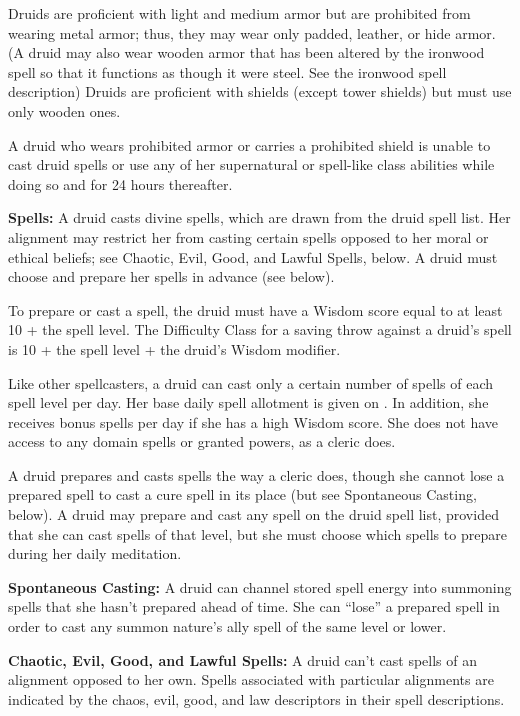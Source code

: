 Druids are proficient with light and medium armor but are prohibited from wearing metal armor; thus, they may wear only padded, leather, or hide armor. (A druid may also wear wooden armor that has been altered by the ironwood spell so that it functions as though it were steel. See the ironwood spell description) Druids are proficient with shields (except tower shields) but must use only wooden ones.

A druid who wears prohibited armor or carries a prohibited shield is unable to cast druid spells or use any of her supernatural or spell-like class abilities while doing so and for 24 hours thereafter.

\textbf{Spells:} A druid casts divine spells, which are drawn from the druid spell list. Her alignment may restrict her from casting certain spells opposed to her moral or ethical beliefs; see Chaotic, Evil, Good, and Lawful Spells, below. A druid must choose and prepare her spells in advance (see below).

To prepare or cast a spell, the druid must have a Wisdom score equal to at least 10 + the spell level. The Difficulty Class for a saving throw against a druid's spell is 10 + the spell level + the druid's Wisdom modifier.

Like other spellcasters, a druid can cast only a certain number of spells of each spell level per day. Her base daily spell allotment is given on . In addition, she receives bonus spells per day if she has a high Wisdom score. She does not have access to any domain spells or granted powers, as a cleric does.

A druid prepares and casts spells the way a cleric does, though she cannot lose a prepared spell to cast a cure spell in its place (but see Spontaneous Casting, below). A druid may prepare and cast any spell on the druid spell list, provided that she can cast spells of  that level, but she must choose which spells to prepare during her daily meditation.


\textbf{Spontaneous Casting:} A druid can channel stored spell energy into summoning spells that she hasn't prepared ahead of time. She can ``lose'' a prepared spell in order to cast any summon nature's ally spell of the same level or lower.

\textbf{Chaotic, Evil, Good, and Lawful Spells:} A druid can't cast spells of an alignment opposed to her own. Spells associated with particular alignments are indicated by the chaos, evil, good, and law descriptors in their spell descriptions.


